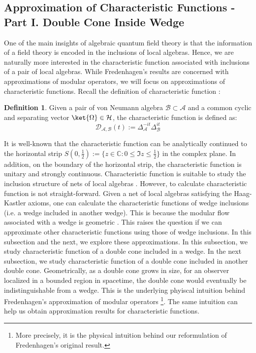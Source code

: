 \documentclass[a4paper,11pt]{article}
\theoremstyle{definition}
\newtheorem{definition}{Definition}[section]
\theoremstyle{remark}
\begin{document}
\subsection{Approximation of Characteristic Functions - Part I. Double Cone Inside Wedge}\label{subsection:coneinsidewedge}
One of the main insights of algebraic quantum field theory is that the information of a field theory is encoded in the inclusions of local algebras. Hence, we are naturally more interested in the characteristic function associated with inclusions of a pair of local algebras. While Fredenhagen's results \cite{fredenhagen} are concerned with approximations of modular operators, we will focus on approximations of characteristic functions. Recall the definition of characteristic function \cite{revolutionizing}:
\begin{definition}
    Given a pair of von Neumann algebra $\mathcal{B}\subset\mathcal{A}$ and a common cyclic and separating vector $\ket{\Omega}\in\mathcal{H}$, the characteristic function is defined as:
    \begin{equation}
        \mathcal{D}_{\mathcal{A},\mathcal{B}}(t) := \Delta_\mathcal{A}^{-it}\Delta_\mathcal{B}^{it}
    \end{equation}
\end{definition}
It is well-known that the characteristic function can be analytically continued to the horizontal strip $S(0, \frac{1}{2}) := \{z\in\mathbb{C}:0\leq \Im{z} \leq \frac{1}{2}\}$ in the complex plane. In addition, on the boundary of the horizontal strip, the characteristic function is unitary and strongly continuous. Characteristic function is suitable to study the inclusion structure of nets of local algebras \cite{revolutionizing}. However, to calculate characteristic function is not straight-forward. Given a net of local algebras satisfying the Haag-Kastler axioms, one can calculate the characteristic functions of wedge inclusions (i.e. a wedge included in another wedge). This is because the modular flow associated with a wedge is geometric \cite{bisognanowichmann}. This raises the question if we can approximate other characteristic functions using those of wedge inclusions. In this subsection and the next, we explore these approximations. In this subsection, we study characteristic function of a double cone included in a wedge. In the next subsection, we study characteristic function of a double cone included in another double cone. Geometrically, as a double cone grows in size, for an observer localized in a bounded region in spacetime, the double cone would eventually be indistinguishable from a wedge. This is the underlying phyiscal intuition behind Fredenhagen's approximation of modular operators \cite{fredenhagen}\footnote{More precisely, it is the physical intuition behind our reformulation of Fredenhagen's original result.}. The same intuition can help us obtain approximation results for characteristic functions.
\end{document}

